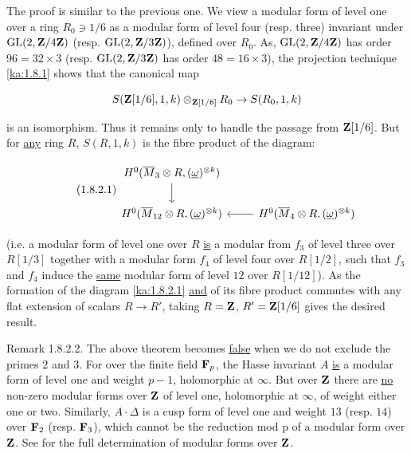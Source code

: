 \begin{kaproof}
The proof is similar to the previous one. We view a modular form of level one
over a ring $R_0\ni 1/6$ as a modular form of level four (resp. three) invariant
under $\operatorname{GL}(2,\mathbf{Z}/4\mathbf{Z})$ (resp. $\operatorname{GL}(2,\mathbf{Z}/3\mathbf{Z})$), defined over $R_0$. As,
$\operatorname{GL}(2,\mathbf{Z}/4\mathbf{Z})$ has order $96 = 32\times 3$ (resp. $\operatorname{GL}(2,\mathbf{Z}/3\mathbf{Z})$ has order
$48 = 16\times 3$), the projection technique \eqref{ka:1.8.1} shows that the canonical
map

\[
S(\mathbf{Z}[1/6],1,k)\otimes_{\mathbf{Z}[1/6]}R_0\to S(R_0,1,k)
\]

is an isomorphism. Thus it remains only to handle the passage from
$\mathbf{Z}[1/6]$. But for \uline{any} ring $R$, $S(R,1,k)$ is the fibre product of the
diagram:

\begin{equation}\tag{1.8.2.1}\label{ka:1.8.2.1}
\begin{tikzcd}
H^0(\Mbar_3\tens R,(\w)^{\otimes k}) \arrow[d] \\
H^0(\Mbar_{12}\tens R,(\w)^{\otimes k}) & H^0(\Mbar_4\tens R,(\w)^{\otimes k}) \arrow[l]
\end{tikzcd}
\end{equation}

(i.e. a modular form of level one over $R$ \uline{is} a modular from $f_3$ of
level three over $R[1/3]$ together with a modular form $f_4$ of level four over
$R[1/2]$, such that $f_3$ and $f_4$ induce the \uline{same} modular form of
level $12$ over $R[1/12]$). As the formation of the diagram \eqref{ka:1.8.2.1}
\uline{and} of its fibre product commutes with any flat extension of scalars
$R\to R'$, taking $R=\mathbf{Z}$, $R'=\mathbf{Z}[1/6]$ gives the desired result.
\end{kaproof}

\begin{kathmstar}{Remark 1.8.2.2.}
The above theorem becomes \uline{false} when we do not exclude the primes $2$
and $3$. For over the finite field $\mathbf{F}_p$, the Hasse invariant $A$ \uline{is} a
modular form of level one and weight $p-1$, holomorphic at $\infty$. But over
$\mathbf{Z}$ there are \uline{no} non-zero modular forms over $\mathbf{Z}$ of level one,
holomorphic at $\infty$, of weight either one or two. Similarly, $A\cdot\Delta$
is a cusp form of level one and weight $13$ (resp. $14$) over $\mathbf{F}_2$ (resp.
$\mathbf{F}_3$), which cannot be the reduction mod p of a modular form over $\mathbf{Z}$. See
\cite{deligne68} for the full determination of modular forms over $\mathbf{Z}$.
\end{kathmstar}

